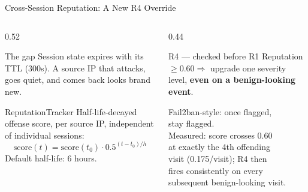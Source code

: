 \documentclass[aspectratio=169, 12pt]{beamer}
\begin{document}
\begin{frame}{Cross-Session Reputation: A New R4 Override}
  \begin{columns}[T]
    \begin{column}{0.52\textwidth}
      \begin{block}{The gap}
        Session state expires with its TTL (300s). A source IP that
        attacks, goes quiet, and comes back looks brand new.
      \end{block}
      \vspace{0.2cm}
      \begin{exampleblock}{ReputationTracker}
        Half-life-decayed offense score, per source IP, independent of
        individual sessions:
        \[
          \text{score}(t) = \text{score}(t_0)\cdot 0.5^{(t-t_0)/h}
        \]
        Default half-life: 6 hours.
      \end{exampleblock}
    \end{column}
    \begin{column}{0.44\textwidth}
      \begin{alertblock}{R4 --- checked before R1}
        Reputation $\geq 0.60 \Rightarrow$ upgrade one severity level,
        \textbf{even on a benign-looking event}.
      \end{alertblock}
      \vspace{0.2cm}
      \begin{center}
        \small\textcolor{honeygrey}{Fail2ban-style: once flagged,\\ stay flagged.\\[4pt]
        Measured: score crosses 0.60\\ at exactly the 4th offending\\
        visit (0.175/visit); R4 then\\ fires consistently on every\\
        subsequent benign-looking visit.}
      \end{center}
    \end{column}
  \end{columns}
\end{frame}
\end{document}
